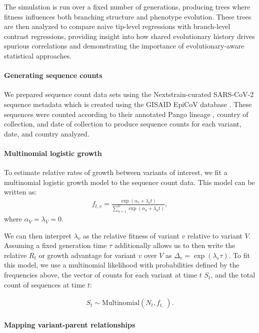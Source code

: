 The simulation is run over a fixed number of generations, producing trees where fitness influences both branching structure and phenotype evolution.
These trees are then analyzed to compare naive tip-level regressions with branch-level contrast regressions, providing insight into how shared evolutionary history drives spurious correlations and demonstrating the importance of evolutionary-aware statistical approaches.

\paragraph{Generating sequence counts}%

We prepared sequence count data sets using the Nextstrain-curated SARS-CoV-2 sequence metadata \cite{Hadfield2018} which is created using the GISAID EpiCoV database \cite{khare2021gisaid}.
These sequences were counted according to their annotated Pango lineage \cite{aksamentov2021nextclade}, country of collection, and date of collection to produce sequence counts for each variant, date, and country analyzed.

\paragraph{Multinomial logistic growth}

To estimate relative rates of growth between variants of interest, we fit a multinomial logistic growth model to the sequence count data.
This model can be written as:
\begin{align*}
    f_{t, v} = \frac{\exp(\alpha_{v} + \lambda_{v} t)}{\sum_{u=1}^{V} \exp(\alpha_{u} + \lambda_{u} t)},
\end{align*}
where $\alpha_{V} = \lambda_{V} = 0$.

We can then interpret $\lambda_{v}$ as the relative fitness of variant $v$ relative to variant $V$.
Assuming a fixed generation time $\tau$ additionally allows us to then write the relative $R_{t}$ or growth advantage for variant $v$ over $V$ as $\Delta_{v} = \exp(\lambda_{v}\tau)$.
To fit this model, we use a multinomial likelihood with probabilities defined by the frequencies above, the vector of counts for each variant at time $t$ $S_{t}$, and the total count of sequences at time $t$:

\begin{align*}
    S_{t} \sim \text{Multinomial}(N_{t}, f_{t, \cdot}).
\end{align*}

\paragraph{Mapping variant-parent relationships}%

